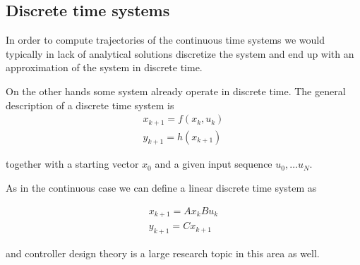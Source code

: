 \subsection{Discrete time systems}

In order to compute trajectories of the continuous time systems we would typically in lack of analytical solutions discretize the system and end up with an approximation of the system in discrete time. 



On the other hands some system already operate in discrete time. The general description of a discrete time system is
\begin{eqnarray}
x_{k+1}=f(x_k,u_k)\\
y_{k+1}=h(x_{k+1})
\end{eqnarray}

together with a starting vector $x_0$ and a given input sequence $u_0,\dots u_N$.

As in the continuous case we can define a linear discrete time system as

\begin{eqnarray}
x_{k+1}=Ax_k Bu_k\\
y_{k+1}=Cx_{k+1}
\end{eqnarray}

and controller design theory is a large research topic in this area as well. 